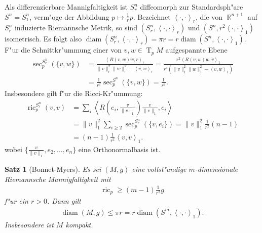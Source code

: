 \documentclass[paper=A4, twoside, chapterprefix=true, bibliography=totoc, headsepline]{scrbook}
\DeclareMathOperator{\R}{\mathbb{R}}
\DeclareMathOperator{\diam}{diam} %
\DeclareMathOperator{\ric}{ric} %
\DeclareMathOperator{\T}{T} %
\theoremstyle{plain}
\newtheorem{Satz}[Dfn]{Satz}
\theoremstyle{nonumberplain}
\theoremstyle{empty}
\theoremstyle{break}
\begin{document}
Als differenzierbare Mannigfaltigkeit ist $S^n_r$ diffeomorph zur Standardsph"are $S^n = S^n_1$, verm"oge der Abbildung $p \mapsto \frac{1}{r}p$. Bezeichnet $\left<\cdot,\cdot\right>_r$, die von
$\R^{n+1}$ auf $S^n_r$ induzierte Riemannsche Metrik, so sind $(S^n_r,\left<\cdot,\cdot\right>_r)$ und $(S^n,r^2\left<\cdot,\cdot\right>_1)$ isometrisch.
Es folgt also $\diam(S^n_r,\left<\cdot,\cdot\right>_r) = \pi r = r \diam(S^n,\left<\cdot,\cdot\right>_1)$.
F"ur die Schnittkr"ummung einer von $v,w \in \T_pM$ aufgespannte Ebene
\begin{align*}
  \sec_p^{S^n_r}(\{v,w\}) & =
  \frac{\left<R(v,w)w,r\right>_r}{\|v\|_r^2\|w\|_r^2-\left<v,w\right>_r}
  =
  \frac{r^2\left<R(v,w)w,v\right>_1}{r^4(\|v\|_1^2\|w\|_1^2-\left<v,w\right>_1)}\\
  & = \frac{1}{r^2} \sec_p^{S^n}(\{v,w\}) = \frac{1}{r^2}.
\end{align*}
Insbesondere gilt f"ur die Ricci-Kr"ummung:
\begin{align*}
  \ric_p^{S_r^n}(v,v) & = \sum_i \left<R\left(e_i,\frac{v}{\|v\|_1}\right)\frac{v}{\|v\|_1},e_i\right>\\
  & = \|v\|_1^2\sum_{i \geq 2}\sec_p^{S^n_r}(\{v,e_i\}) = \|v\|_1^2 \frac{1}{r^2}(n-1)\\
  & = (n-1)\frac{1}{r^2}\left<v,v\right>_1.
\end{align*}
wobei $\{\frac{v}{\|v\|_1}, e_2, \ldots, e_n\}$ eine Orthonormalbasis ist.

\begin{Satz}[Bonnet-Myers]
  Es sei $(M,g)$ eine vollst"andige $m$-dimensionale Riemannsche Mannigfaltigkeit mit 
  \begin{align*}
    \ric_p \geq (m-1) \frac{1}{r^2} g
  \end{align*}
  f"ur ein $r > 0$.
  Dann gilt
  \begin{align*}
    \diam(M,g) \leq \pi r = r \diam(S^m,\left<\cdot,\cdot\right>_1).
  \end{align*}
  Insbesondere ist $M$ kompakt.
\end{Satz}
\end{document}
